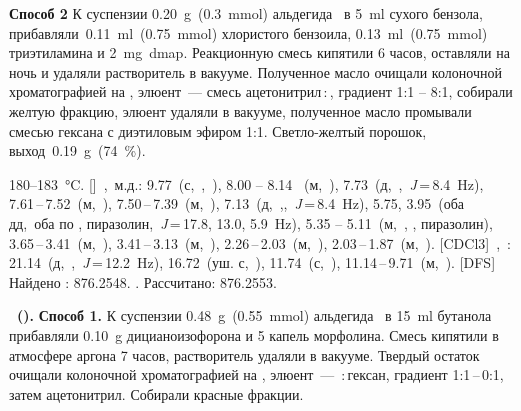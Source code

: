 \textbf{Способ 2} К суспензии \SI{0.20}{\gram}~(\SI{0.3}{\mmol}) альдегида~\textbf{} в \SI{5}{\milli\litre} сухого бензола, прибавляли~\SI{0.11}{\milli\litre}~(\SI{0.75}{\mmol}) хлористого бензоила, \SI{0.13}{\milli\litre}~(\SI{0.75}{\mmol}) триэтиламина и \SI{2}{\milli\gram}~\ac{dmap}.
Реакционную смесь кипятили 6 часов, оставляли на ночь и удаляли растворитель в вакууме.
Полученное масло очищали колоночной хроматографией на , элюент~--- смесь ацетонитрил\,:\,, градиент 1:1 -- 8:1, собирали желтую фракцию, элюент удаляли в вакууме, полученное масло промывали смесью гексана с диэтиловым эфиром 1:1. Светло-желтый порошок, выход~\SI{0.19}{\gram}~(\SI{74}{\percent}).
\begin{experimental}
     180--\SI{183}{\celsius}.
    []~\chemdelta,~м.д.: 9.77~(с,~,~), 8.00 -- 8.14 ~(м,~), 7.73~(д,~,~\textit{J}\,=\,8.4~\si{\hertz}), 7.61\,--\,7.52~(м,~), 7.50\,--\,7.39~(м,~), 7.13~(д,~,,~\textit{J}\,=\,8.4~\si{\hertz}), 5.75, 3.95~(оба дд,~оба по , пиразолин,~\textit{J}\,=\,17.8, 13.0, 5.9~\si{\hertz}), 5.35 -- 5.11~(м,~, , пиразолин), 3.65\,--\,3.41~(м,~), 3.41\,--\,3.13~(м,~), 2.26\,--\,2.03~(м,~), 2.03\,--\,1.87~(м,~).
    [CDCl3]~\chemdelta,~\si{\ppm}: 21.14~(д,~,~\textit{J}\,=\,12.2~\si{\hertz}), 16.72~(уш. с,~), 11.74~(с,~), 11.14\,--\,9.71~(м,~).
    [DFS] Найдено \ce{[M+]}: \num{876.2548}. . Рассчитано:  \num{876.2553}.
\end{experimental}

\textbf{~().} \textbf{Способ 1.} К суспензии \SI{0.48}{\gram}~(\SI{0.55}{\mmol}) альдегида~\textbf{} в \SI{15}{\milli\litre} бутанола прибавляли \SI{0.10}{\gram} дицианоизофорона и 5 капель морфолина. Смесь кипятили в атмосфере аргона 7 часов, растворитель удаляли в вакууме. Твердый остаток очищали колоночной хроматографией на , элюент~--- \,:\,гексан, градиент 1:1\,--\,0:1, затем ацетонитрил. Собирали красные фракции. 

